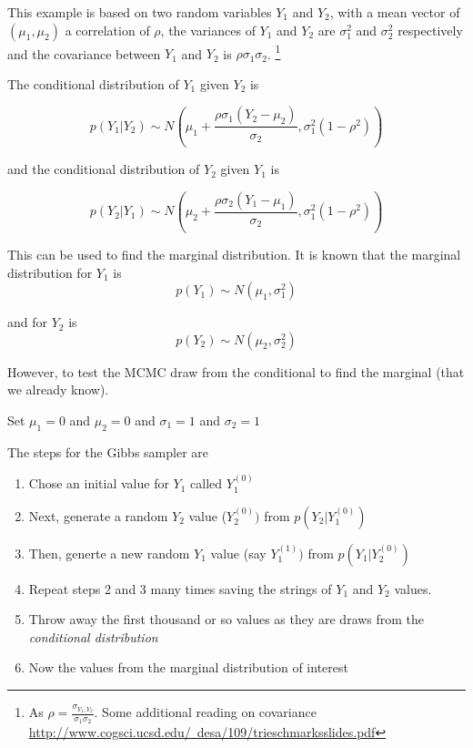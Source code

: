 \documentclass[12pt, a4paper, oneside]{article}\usepackage{graphicx, color}
\begin{document}
This example is based on two random variables $Y_1$ and $Y_2$, with a mean vector of $(\mu_1, \mu_2)$ a correlation of $\rho$, the variances of $Y_1$ and $Y_2$ are $\sigma_1^2$ and $\sigma_2^2$ respectively and the covariance between $Y_1$ and $Y_2$ is $\rho \sigma_1 \sigma_2$. \footnote{As $\rho = \frac{\sigma_{Y_1, Y_2}}{\sigma_1 \sigma_2}$.  Some additional reading on covariance \href{http://www.cogsci.ucsd.edu/~desa/109/trieschmarksslides.pdf}{http://www.cogsci.ucsd.edu/~desa/109/trieschmarksslides.pdf}}



The conditional distribution of $Y_1$ given $Y_2$ is 

\begin{equation}
p(Y_1| Y_2) \sim N \left(\mu_1 + \frac{\rho\sigma_1(Y_2 - \mu_2)}{\sigma_2}, \sigma_1^2(1 - \rho^2)\right)
\end{equation}

and the conditional distribution of $Y_2$ given $Y_1$ is

\begin{equation}
p(Y_2| Y_1) \sim N \left(\mu_2 + \frac{\rho\sigma_2(Y_1 - \mu_1)}{\sigma_2}, \sigma_1^2(1 - \rho^2) \right)
\end{equation}

This can be used to find the marginal distribution. It is known that the marginal distribution for $Y_1$ is
\begin{equation}
p(Y_1) \sim N(\mu_1, \sigma_1^2)
\end{equation}

and for $Y_2$ is 
\begin{equation}
p(Y_2) \sim N(\mu_2, \sigma_2^2)
\end{equation}

However, to test the MCMC draw from the conditional to find the marginal (that we already know).  

Set $\mu_1 = 0$ and $\mu_2 = 0$ and $\sigma_1 = 1$ and $\sigma_2 = 1$

The steps for the Gibbs sampler are 
\begin{enumerate}
\item Chose an initial value for $Y_1$ called $Y_1^{(0)}$
\item Next, generate a random $Y_2$ value ($Y_2^{(0)})$ from $p(Y_2| Y_1^{(0)})$
\item Then, generte a new random $Y_1$ value (say $Y_1^{(1)})$ from $p(Y_1| Y_2^{(0)})$
\item Repeat steps 2 and 3 many times saving the strings of $Y_1$ and $Y_2$ values.
\item Throw away the first thousand or so values as they are draws from the \emph{conditional distribution}
\item Now the values from the marginal distribution of interest
\end{enumerate}
\end{document}
